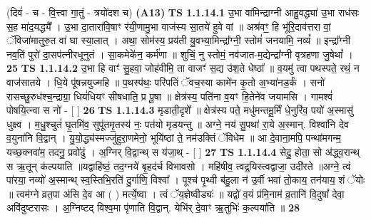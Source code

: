 \documentclass[17pt]{extarticle}
\begin{document}
                  \newline
                      (दिवं॑ - च - वि॒त्त्वा गा॒तुं - त्रयो॑दश च)  \textbf{(A13)} \newline \newline
                                        \textbf{ TS 1.1.14.1} \newline
                  उ॒भा वा॑मिन्द्राग्नी आहु॒वद्ध्या॑ उ॒भा राध॑सः स॒ह मा॑द॒यद्ध्यै᳚ । उ॒भा दा॒तारा॑वि॒षाꣳ र॑यी॒णामु॒भा वाज॑स्य सा॒तये॑ हुवे वां ॥ अश्र॑वꣳ॒॒ हि भू॑रि॒दाव॑त्तरा वां॒ ॅविजा॑मातुरु॒त वा॑ घा स्या॒लात् । अथा॒ सोम॑स्य॒ प्रय॑ती यु॒वभ्या॒मिन्द्रा᳚ग्नी॒ स्तोमं॑ जनयामि॒ नव्यं᳚ ॥ इन्द्रा᳚ग्नी नव॒तिं पुरो॑ दा॒सप॑त्नीरधूनुतं । सा॒कमेके॑न॒ कर्म॑णा ॥ शुचिं॒ नु स्तोमं॒ नव॑जात-म॒द्येन्द्रा᳚ग्नी वृत्रहणा जु॒षेथां᳚ । \textbf{  25} \newline
                  \newline
                                \textbf{ TS 1.1.14.2} \newline
                  उ॒भा हि वाꣳ॑ सु॒हवा॒ जोह॑वीमि॒ ता वाजꣳ॑ स॒द्य उ॑श॒ते धेष्ठा᳚ ॥ व॒यमु॑ त्वा पथस्पते॒ रथं॒ न वाज॑सातये । धि॒ये पू॑षन्नयुज्महि ॥ प॒थस्प॑थः॒ परि॑पतिं ॅवच॒स्या कामे॑न कृ॒तो अ॒भ्या॑नड॒र्कं । सनो॑ रासच्छु॒रुध॑श्च॒न्द्राग्रा॒ धियं॑धियꣳ सीषधाति॒ प्र पू॒षा ॥ क्षेत्र॑स्य॒ पति॑ना व॒यꣳ हि॒तेने॑व जयामसि । गामश्वं॑ पोषयि॒त्न्वा स नो॑ - [ ] \textbf{  26} \newline
                  \newline
                                \textbf{ TS 1.1.14.3} \newline
                  मृडाती॒दृशे᳚ ॥ क्षेत्र॑स्य पते॒ मधु॑मन्तमू॒र्मिं धे॒नुरि॑व॒ पयो॑ अ॒स्मासु॑ धुक्ष्व । म॒धु॒श्चुतं॑ घृ॒तमि॑व॒ सुपू॑तमृ॒तस्य॑ नः॒ पत॑यो मृडयन्तु ॥ अग्ने॒ नय॑ सु॒पथा॑ रा॒ये अ॒स्मान्. विश्वा॑नि देव व॒युना॑नि वि॒द्वान् । यु॒यो॒द्ध्य॑स्मज्जु॑हुरा॒णमेनो॒ भूयि॑ष्ठां ते॒ नम॑उक्तिं ॅविधेम ॥ आ दे॒वाना॒मपि॒ पन्था॑मगन्म॒ यच्छ॒क्नवा॑म॒ तदनु॒ प्रवो॑ढुं । अ॒ग्निर् वि॒द्वान्थ् स य॑जा॒थ् - [ ] \textbf{  27} \newline
                  \newline
                                \textbf{ TS 1.1.14.4} \newline
                  सेदु॒ होता॒ सो अ॑द्ध्व॒रान्थ् स ऋ॒तून् क॑ल्पयाति ॥यद्वाहि॑ष्ठं॒ तद॒ग्नये॑ बृ॒हद॑र्च विभावसो । महि॑षीव॒ त्वद्र॒यिस्त्वद्वाजा॒ उदी॑रते ॥अग्ने॒ त्वं पा॑रया॒ नव्यो॑ अ॒स्मान्थ् स्व॒स्तिभि॒रति॑ दु॒र्गाणि॒ विश्वा᳚ । पूश्च॑ पृ॒थ्वी ब॑हु॒ला न॑ उ॒र्वी भवा॑ तो॒काय॒ तन॑याय॒ शं ॅयोः ॥ त्वम॑ग्ने व्रत॒पा अ॑सि दे॒व आ ( ) मर्त्ये॒ष्वा । त्वं ॅय॒ज्ञेष्वीड्यः॑ ॥ यद्वो॑ व॒यं प्र॑मि॒नाम॑ व्र॒तानि॑ वि॒दुषां᳚ देवा॒ अवि॑दुष्टरासः । अ॒ग्निष्टद् विश्व॒मा पृ॑णाति वि॒द्वान्. येभि॑र् दे॒वाꣳ ऋ॒तुभिः॑ क॒ल्पया॑ति ॥ \textbf{  28} \newline
\end{document}
